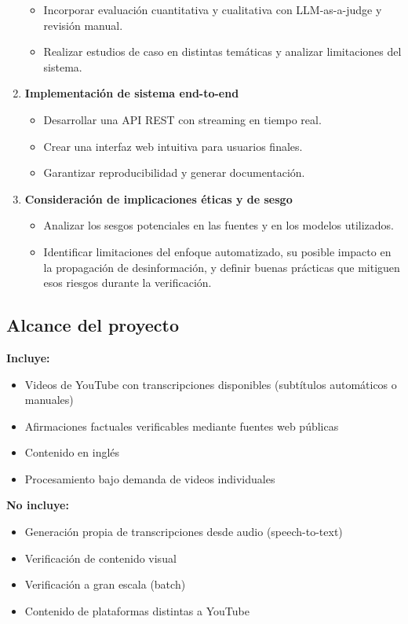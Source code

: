 \documentclass[12pt,a4paper]{article}
\begin{document}
\begin{enumerate}
\begin{itemize}
        \item Incorporar evaluación cuantitativa y cualitativa con LLM-as-a-judge y revisión manual.
        \item Realizar estudios de caso en distintas temáticas y analizar limitaciones del sistema.
    \end{itemize}
    \item \textbf{Implementación de sistema end-to-end}
    \begin{itemize}
        \item Desarrollar una API REST con streaming en tiempo real.
        \item Crear una interfaz web intuitiva para usuarios finales.
        \item Garantizar reproducibilidad y generar documentación.
    \end{itemize}
    \item \textbf{Consideración de implicaciones éticas y de sesgo}
    \begin{itemize}
        \item Analizar los sesgos potenciales en las fuentes y en los modelos utilizados.
        \item Identificar limitaciones del enfoque automatizado, su posible impacto en la propagación de desinformación, y definir buenas prácticas que mitiguen esos riesgos durante la verificación.
    \end{itemize}
\end{enumerate}

\subsection{Alcance del proyecto}

\textbf{Incluye:}
\begin{itemize}
    \item Videos de YouTube con transcripciones disponibles (subtítulos automáticos o manuales)
    \item Afirmaciones factuales verificables mediante fuentes web públicas
    \item Contenido en inglés
    \item Procesamiento bajo demanda de videos individuales
\end{itemize}

\textbf{No incluye:}
\begin{itemize}
    \item Generación propia de transcripciones desde audio (speech-to-text)
    \item Verificación de contenido visual
    \item Verificación a gran escala (batch)
    \item Contenido de plataformas distintas a YouTube
\end{itemize}
\end{document}
